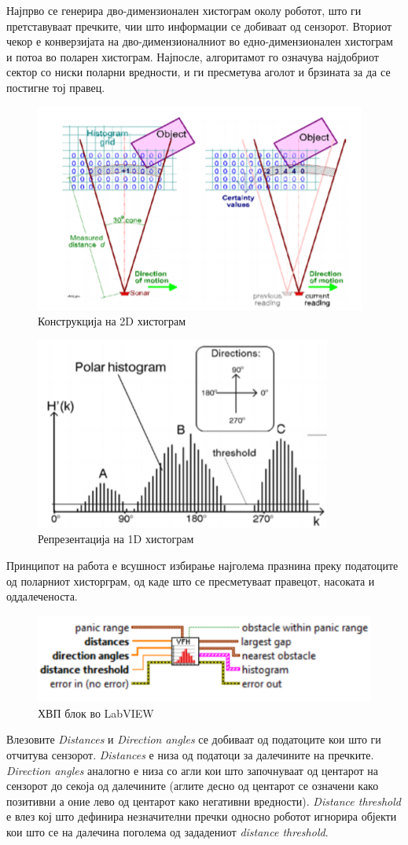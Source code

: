 \documentclass[12pt]{article}
\begin{document}
  Најпрво се генерира дво-димензионален хистограм околу роботот, што ги претставуваат пречките, чии што информации се добиваат од сензорот. Вториот чекор е конверзијата на дво-димензионалниот во едно-димензионален хистограм и потоа во поларен хистограм. Најпосле, алгоритамот го означува најдобриот сектор со ниски поларни вредности, и ги пресметува аголот и брзината за да се постигне тој правец.

  \begin{figure}[H]
    \centering
    \includegraphics[width=0.35\linewidth]{./images/2d_his.png}
    \caption{Конструкција на 2D хистограм}
    \label{fig:2d_his.png}
    \end{figure}

  \begin{figure}[H]
    \centering
    \includegraphics[width=0.35\linewidth]{./images/1d_his.png}
    \caption{Репрезентација на 1D хистограм}
    \label{fig:1d_his.png}
    \end{figure}

  Принципот на работа е всушност избирање најголема празнина преку податоците од поларниот хисторграм, од каде што се пресметуваат правецот, насоката и оддалеченоста.

  \begin{figure}[H]
    \centering
    \includegraphics[width=0.5\linewidth]{./images/vfh_lv.png}
    \caption{ХВП блок во LabVIEW}
    \label{fig:vfh_lv.png}
    \end{figure}

  Влезовите \textit{Distances} и \textit{Direction angles} се добиваат од податоците кои што ги отчитува сензорот. \textit{Distances} е низа од податоци за далечините на пречките. \textit{Direction angles} аналогно е низа со агли кои што започнуваат од центарот на сензорот до секоја од далечините (аглите десно од центарот се означени како позитивни а оние лево од центарот како негативни вредности). \textit{Distance threshold} е влез кој што дефинира незначителни пречки односно роботот игнорира објекти кои што се на далечина поголема од зададениот \textit{distance threshold}.
\end{document}
